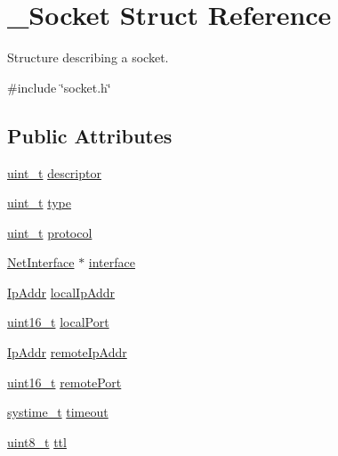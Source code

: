\hypertarget{struct__Socket}{}\section{\+\_\+\+Socket Struct Reference}
\label{struct__Socket}


Structure describing a socket.  




{\ttfamily \#include \char`\"{}socket.\+h\char`\"{}}

\subsection*{Public Attributes}
\begin{DoxyCompactItemize}
\item 
\hyperlink{compiler__port_8h_a12a1e9b3ce141648783a82445d02b58d}{uint\+\_\+t} \hyperlink{struct__Socket_adf0f5400b657ecbd6b68014840ffdae4}{descriptor}
\item 
\hyperlink{compiler__port_8h_a12a1e9b3ce141648783a82445d02b58d}{uint\+\_\+t} \hyperlink{struct__Socket_adc282596c6bd94ee739f5b67374b4761}{type}
\item 
\hyperlink{compiler__port_8h_a12a1e9b3ce141648783a82445d02b58d}{uint\+\_\+t} \hyperlink{struct__Socket_a28dccb8fd556a97be8d0d4344288744e}{protocol}
\item 
\hyperlink{net_8h_a2234db8911a1148c9159979d8f5e0d6b}{Net\+Interface} $\ast$ \hyperlink{struct__Socket_a8dfa1ada309ed2bb86fe01ce1f3d47e8}{interface}
\item 
\hyperlink{structIpAddr}{Ip\+Addr} \hyperlink{struct__Socket_a122697462b5d73ebd303f4f0a2b3db01}{local\+Ip\+Addr}
\item 
\hyperlink{stdint_8h_a273cf69d639a59973b6019625df33e30}{uint16\+\_\+t} \hyperlink{struct__Socket_a24701cbaad250f6d0fd130987af9290e}{local\+Port}
\item 
\hyperlink{structIpAddr}{Ip\+Addr} \hyperlink{struct__Socket_a0d26438ef8e64afc1253df250a9745b7}{remote\+Ip\+Addr}
\item 
\hyperlink{stdint_8h_a273cf69d639a59973b6019625df33e30}{uint16\+\_\+t} \hyperlink{struct__Socket_a942b99d94376540d6e25a591901e27b7}{remote\+Port}
\item 
\hyperlink{compiler__port_8h_ae3e32a98d431a02106616da3071832dd}{systime\+\_\+t} \hyperlink{struct__Socket_af161e3cd809e55347bfe382c7899d98d}{timeout}
\item 
\hyperlink{stdint_8h_aba7bc1797add20fe3efdf37ced1182c5}{uint8\+\_\+t} \hyperlink{struct__Socket_a2992ae3236a8da34f54d98d1d6914256}{ttl}

\end{DoxyCompactItemize}
